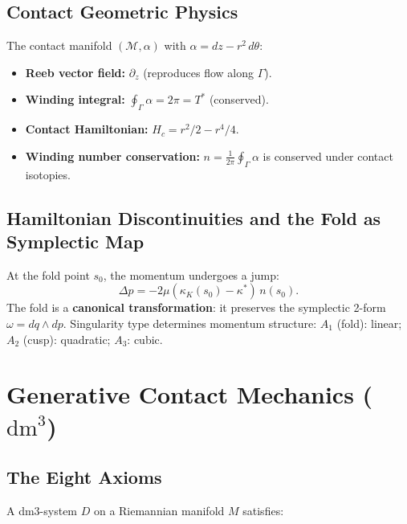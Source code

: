 \documentclass[11pt, twoside, openright]{book}
\theoremstyle{plain}
\theoremstyle{definition}
\newcommand{\dm}{\mathrm{dm}^3}
\begin{document}
\section{Contact Geometric Physics}

The contact manifold $(\mathcal{M}, \alpha)$ with
$\alpha = dz - r^2\,d\theta$:
\begin{itemize}[leftmargin=*]
  \item \textbf{Reeb vector field:} $\partial_z$ (reproduces flow along $\Gamma$).
  \item \textbf{Winding integral:} $\oint_\Gamma \alpha = 2\pi = T^*$
    (conserved).
  \item \textbf{Contact Hamiltonian:} $H_c = r^2/2 - r^4/4$.
  \item \textbf{Winding number conservation:}
    $n = \tfrac{1}{2\pi}\oint_\Gamma \alpha$ is conserved under contact
    isotopies.
\end{itemize}

\section{Hamiltonian Discontinuities and the Fold as Symplectic Map}

At the fold point $s_0$, the momentum undergoes a jump:
\[
\Delta p = -2\mu(\kappa_K(s_0) - \kappa^*)\,n(s_0).
\]
The fold is a \textbf{canonical transformation}: it preserves the
symplectic 2-form $\omega = dq \wedge dp$. Singularity type determines
momentum structure: $A_1$ (fold): linear; $A_2$ (cusp): quadratic;
$A_3$: cubic.

\chapter{Generative Contact Mechanics ($\dm$)}

\section{The Eight Axioms}

A dm3-system $D$ on a Riemannian manifold $M$ satisfies:
\end{document}
